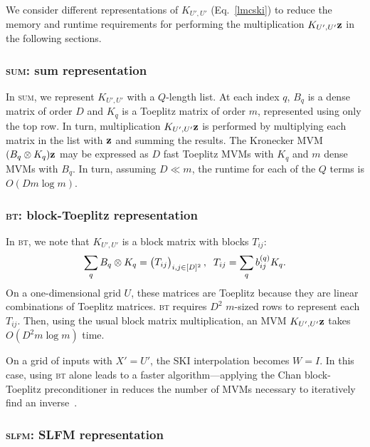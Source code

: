 \documentclass{article}
\begin{document}
We consider different representations of $K_{{U'},{U'}}$ (Eq.~\ref{lmcski}) to reduce the memory and runtime requirements for performing the multiplication $K_{{U'},{U'}}\textbf{z}$ in the following sections.

\subsubsection{\textsc{sum}: sum representation}

In \textsc{sum}, we represent $K_{{U'},{U'}}$ with a $Q$-length list. At each index $q$, $B_q$ is a dense matrix of order $D$ and $K_q$ is a Toeplitz matrix of order $m$, represented using only the top row. In turn, multiplication $K_{{U'},{U'}}\textbf{z}$ is performed by multiplying each matrix in the list with $\textbf{z}$ and summing the results. The Kronecker MVM $(B_q\otimes K_q)\textbf{z}$ may be expressed as $D$ fast Toeplitz MVMs with $K_q$ and $m$ dense MVMs with $B_q$. In turn, assuming $D\ll m$, the runtime for each of the $Q$ terms is $O(Dm\log m)$.

\subsubsection{\textsc{bt}: block-Toeplitz representation}

In \textsc{bt}, we note that $K_{{U'},{U'}}$ is a block matrix with blocks $T_{ij}$:
\begin{align*}
\sum_qB_q\otimes K_q =\begin{pmatrix} T_{ij} \end{pmatrix}_{i,j\in[D]^2},\;\; T_{ij}=\sum_qb_{ij}^{(q)}K_q.
\end{align*}
On a one-dimensional grid $U$, these matrices are Toeplitz because they are linear combinations of Toeplitz matrices. \textsc{bt} requires $D^2$ $m$-sized rows to represent each $T_{ij}$. Then, using the usual block matrix multiplication, an MVM $K_{{U'},{U'}}\textbf{z}$ takes $O(D^2m\log m)$ time.

On a grid of inputs with ${X'}={U'}$, the SKI interpolation becomes $W=I$. In this case, using \textsc{bt} alone leads to a faster algorithm---applying the Chan block-Toeplitz preconditioner in reduces the number of MVMs necessary to iteratively find an inverse~\cite{chan1994circulant}.

\subsubsection{\textsc{slfm}: SLFM representation}
\end{document}
